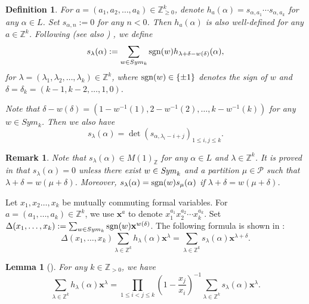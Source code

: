 \documentclass[12pt]{article}
\def\ZZ{{\mathbb Z}}
\def\bs{\it}            %
\def\Sym{{\bs Sym}}
\def\sgn{{\rm sgn}}
\newcommand{\x}{\mathbf{x}}
\newtheorem{lem}[thm]{Lemma}
\newtheorem{rem}[thm]{Remark}
\newtheorem{de}[thm]{Definition}
\begin{document}
\begin{de}\label{deslambda}
For  $a=(a_1,a_2, \dots, a_k)\in \ZZ_{\geq 0}^k$,  denote 
$h_a(\alpha) = s_{\alpha,a_1} \cdots s_{\alpha,a_k}$ for any $\alpha\in L$.
Set  $s_{\alpha,n}:=0 $ for any $n <0$. Then $h_a(\alpha)$ is also well-defined for any $a\in\ZZ^k$.  
Following \cite{LP,Pro} (see also \cite{ivoa}) , we define 
\begin{equation} \label{slambda0}
s_\lambda(\alpha):= \sum_{w\in Sym_k} \sgn(w) h_{\lambda+\delta-w(\delta)}(\alpha),
\end{equation} 
for $\lambda=(\lambda_1, \lambda_2, \dots, \lambda_k)\in 
\ZZ^k$, where $\sgn(w)\in \{\pm 1\}$ denotes the sign of $w$ and $\delta=\delta_k =(k-1,k-2, \dots,1, 0)$.  

Note that $\delta-w(\delta)= (1-w^{-1}(1), 2-w^{-1}(2), \dots, k-w^{-1}(k))$ for any $w\in Sym_k$. 
Then we also have 
\begin{equation} \label{slambda}
s_{\lambda} (\alpha)= \det(s_{\alpha, \lambda_i -i+j})_{1\leq i,j\leq k}. 
\end{equation}
\end{de}

\begin{rem}\label{rem3.5}
Note that $s_{\lambda} (\alpha)\in M(1)_\ZZ$ for any $\alpha\in L$  and $\lambda\in \ZZ^k$. It is proved in \cite{LP} that $s_\lambda(\alpha)=0$ unless there exist $w\in \Sym_k$ and a partition $\mu\in \mathcal{P}$ such that  $\lambda+ \delta=w(\mu+\delta)$.  Moreover,  $s_\lambda(\alpha)=\sgn(w)s_\mu(\alpha)$ if $\lambda+ \delta=w(\mu+\delta)$. 
\end{rem}

Let $x_1, x_2\dots, x_k$ be mutually commuting formal variables. For $a=(a_1, \dots, a_k)\in \ZZ^k$, we use $\x^a$ to  denote $x_1^{a_1} x_2^{a_2} \cdots x_k^{a_k}$.  Set $\Delta(x_1, \dots, x_k) : = \sum_{w\in Sym_k} \sgn(w) \x^{w(\delta)}$. The following formula is shown in \cite[Proposition 7.2]{LP}: 
 \begin{equation}\label{eq3}
	\Delta(x_1, \dots, x_k)\sum_{\lambda\in \ZZ^{k}} h_{\lambda}(\alpha) \x^\lambda =  \sum_{\lambda\in \ZZ^{k}} s_\lambda(\alpha) \x^{\lambda+\delta}. 
\end{equation}

\begin{lem}[\cite{LP,Pro}]\label{slambda1}
For any $k\in \ZZ_{>0}$, we have 
\[
\sum_{\lambda\in \ZZ^{k}} h_{\lambda}(\alpha) \x^\lambda = \prod_{1\leq i<j\leq k} (1-\frac{x_j}{x_i})^{-1} \sum_{\lambda\in \ZZ^{k}} s_\lambda(\alpha) \x^\lambda. 
\]	
\end{lem}
 
\end{document}
